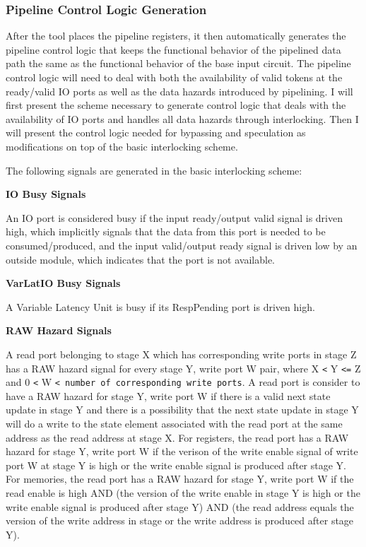 \subsubsection{Pipeline Control Logic Generation}
\label{section:controlLogicGen}
After the tool places the pipeline registers, it then automatically generates the pipeline control logic that keeps the functional behavior of the pipelined data path the same as the functional behavior of the base input circuit. The pipeline control logic will need to deal with both the availability of valid tokens at the ready/valid IO ports as well as the data hazards introduced by pipelining. I will first present the scheme necessary to generate control logic that deals with the availability of IO ports and handles all data hazards through interlocking. Then I will present the control logic needed for bypassing and speculation as modifications on top of the basic interlocking scheme.

The following signals are generated in the basic interlocking scheme:

{\bf IO Busy Signals}

An IO port is considered busy if the input ready/output valid signal is driven high, which implicitly signals that the data from this port is needed to be consumed/produced, and the input valid/output ready signal is driven low by an outside module, which indicates that the port is not available.


{\bf VarLatIO Busy Signals}

A Variable Latency Unit is busy if its RespPending port is driven high.


{\bf RAW Hazard Signals}

A read port belonging to stage X which has corresponding write ports in stage Z has a RAW hazard signal for every stage Y, write port W pair, where X {\tt <} Y {\tt <=} Z and 0 {\tt <} W {\tt < number of corresponding write ports}. A read port is consider to have a RAW hazard for stage Y, write port W if there is a valid next state update in stage Y and there is a possibility that the next state update in stage Y will do a write to the state element associated with the read port at the same address as the read address at stage X. For registers, the read port has a RAW hazard for stage Y, write port W if the verison of the write enable signal of write port W at stage Y is high or the write enable signal is produced after stage Y. For memories, the read port has a RAW hazard for stage Y, write port W if the read enable is high AND (the version of the write enable in stage Y is high or the write enable signal is produced after stage Y) AND (the read address equals the version of the write address in stage or the write address is produced after stage Y).


